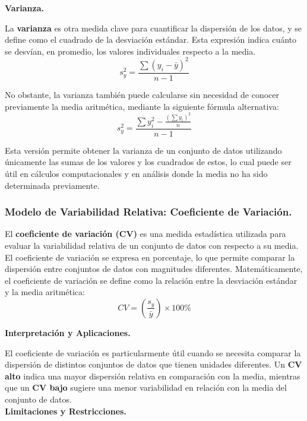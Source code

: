\documentclass{article}
\begin{document}
\noindent \textbf{Varianza.}

\noindent La \textbf{varianza} es otra medida clave para cuantificar la dispersión de los datos, y se define como el cuadrado de la desviación estándar. Esta expresión indica cuánto se desvían, en promedio, los valores individuales respecto a la media.
\begin{equation}
    s_y^2 = \frac{\sum (y_i - \bar{y})^2}{n-1}
\end{equation}

No obstante, la varianza también puede calcularse sin necesidad de conocer previamente la media aritmética, mediante la siguiente fórmula alternativa:
\begin{equation}
    s_y^2 = \frac{\sum y_i^2 - \frac{(\sum y_i)^2}{n}}{n-1}
\end{equation}

Esta versión permite obtener la varianza de un conjunto de datos utilizando únicamente las sumas de los valores y los cuadrados de estos, lo cual puede ser útil en cálculos computacionales y en análisis donde la media no ha sido determinada previamente.

\subsubsection{Modelo de Variabilidad Relativa: Coeficiente de Variación.}
El \textbf{coeficiente de variación (CV)} es una medida estadística utilizada para evaluar la variabilidad relativa de un conjunto de datos con respecto a su media. El coeficiente de variación se expresa en porcentaje, lo que permite comparar la dispersión entre conjuntos de datos con magnitudes diferentes. Matemáticamente, el coeficiente de variación se define como la relación entre la desviación estándar y la media aritmética:
\begin{equation}
    CV = \left( \frac{s_y}{\bar{y}} \right) \times 100\%
\end{equation}

\noindent \textbf{Interpretación y Aplicaciones.}

El coeficiente de variación es particularmente útil cuando se necesita comparar la dispersión de distintos conjuntos de datos que tienen unidades diferentes. Un \textbf{CV alto} indica una mayor dispersión relativa en comparación con la media, mientras que un \textbf{CV bajo} sugiere una menor variabilidad en relación con la media del conjunto de datos.\\

\noindent \textbf{Limitaciones y Restricciones.}
\end{document}

